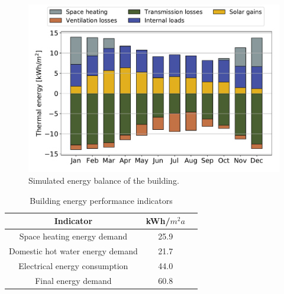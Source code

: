 \documentclass[twocolumn, a4paper,10pt]{article}
\begin{document}
\begin{figure}[H]
\centering
\includegraphics[scale=0.34]{img/HDU_Enbal.pdf}
\caption{Simulated energy balance of the building.}
\label{fig:HDU_Enbal}
\vspace{-5pt}  %
\end{figure}

\begin{table}[H]
\caption{Building energy performance indicators}
\label{tab:indicators}
\centering
\begin{tabular}{| c | c | c | }
  \hline
  \bf{Indicator} & \bf{kWh/$m^2a$} \\
  \hline
  Space heating energy demand & 25.9 \\
  Domestic hot water energy demand & 21.7 \\
  Electrical energy consumption & 44.0 \\
  Final energy demand & 60.8 \\
  \hline
\end{tabular}
\vspace{-5pt}   %
\end{table}

\end{document}

